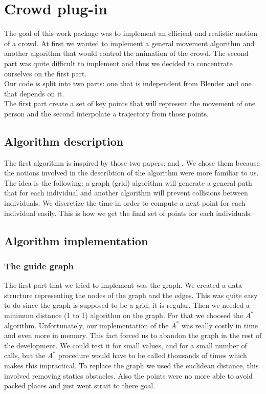 \section{Crowd plug-in}

The goal of this work package was to implement an efficient and realistic motion of a crowd. At first we wanted to implement a general movement algorithm and another algorithm that would control the animation of the crowd. The second part was quite difficult to implement and thus we decided to concentrate ourselves on the first part.\\
Our code is split into two parts: one that is independent from Blender and one that depends on it. \\
The first part create a set of key points that will represent the movement of one person and the second interpolate a trajectory from those points.

\subsection{Algorithm description}

The first algorithm is inspired by those two papers: \cite{PLE} and \cite{vandenBerg2011}. We chose them because the notions involved in the describtion of the algorithm were more familiar to us.
The idea is the following: a graph (grid) algorithm will generate a general path that for each individual and another algorithm will prevent collisions between individuals. We discretize the time in order to compute a next point for each individual easily. This is how we get the final set of points for each individuals.


\subsection{Algorithm implementation}

\subsubsection{The guide graph}

The first part that we tried to implement was the graph. We created a data structure representing the nodes of the graph and the edges. This was quite easy to do since the graph is supposed to be a grid, it is regular.
Then we needed a minimum distance (1 to 1) algorithm on the graph. For that we choosed the $A^*$ algorithm. Unfortunately, our implementation of the $A^*$ was really costly in time and even more in memory. This fact forced us to abandon the graph in the rest of the development. We could test it for small values, and for a small number of calls, but the $A^*$ procedure would have to be called thousands of times which makes this impractical. 
To replace the graph we used the euclidean distance, this involved removing statics obstacles. Also the points were no more able to avoid packed places and just went strait to there goal.

